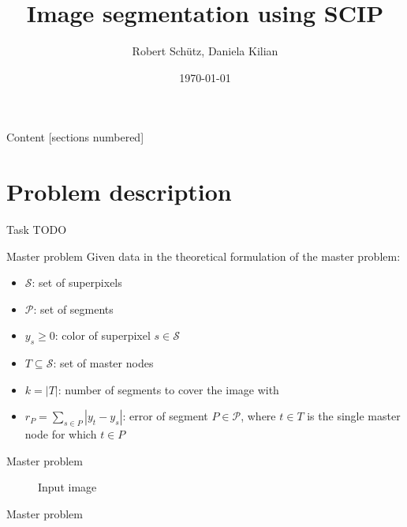\documentclass[fleqn]{beamer}
\title{Image segmentation using SCIP}
\subtitle{}
\date{\today}
\author{Robert Schütz, Daniela Kilian}
\institute{Advanced project SS 2017}
\newcommand{\superpixels}{\mathcal{S}}
\newcommand{\segments}{\mathcal{P}}
\begin{document}
	\maketitle
	
	\begin{frame}{Content}
		[sections numbered]
		\tableofcontents
	\end{frame}

	\section{Problem description}
	\begin{frame}{Task}
		TODO
	\end{frame}	
	
	\begin{frame}{Master problem}
		Given data in the theoretical formulation of the master problem:
		\begin{itemize}
			\item $\superpixels$: set of superpixels
			\item $\segments$: set of segments %
			\item $y_s\geq0$: color of superpixel $s\in\superpixels$
			\item $T\subseteq\superpixels$: set of master nodes %
			\item $k=|T|$: number of segments to cover the image with
			\item $r_P=\sum_{s\in P}|y_t-y_s|$: error of segment $P\in\segments$,
				where $t\in T$ is the single master node for which $t\in P$
		\end{itemize}
	\end{frame}
	
	\begin{frame}{Master problem}
		\begin{figure}
			\centering
				
				\caption{Input image}
			
		\end{figure}
	\end{frame}
	
	\begin{frame}{Master problem}
		\begin{figure}
			\centering
			
		\end{figure}
	\end{frame}
	
\end{document}
